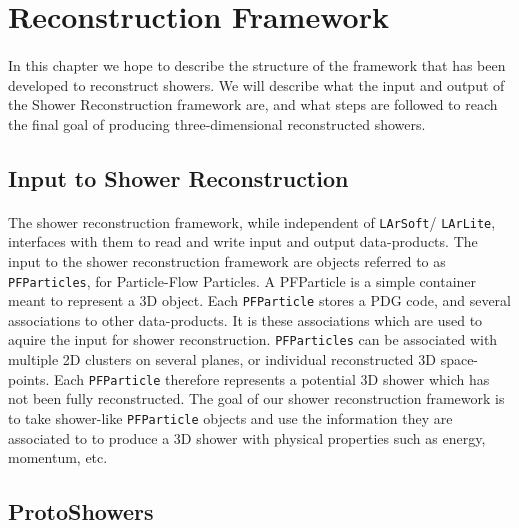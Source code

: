 \section{Reconstruction Framework}
\paragraph{}In this chapter we hope to describe the structure of the framework that has been developed to reconstruct showers. We will describe what the input and output of the Shower Reconstruction framework are, and what steps are followed to reach the final goal of producing three-dimensional reconstructed showers.

\subsection{Input to Shower Reconstruction}
\paragraph{}The shower reconstruction framework, while independent of \texttt{LArSoft}/ \texttt{LArLite}, interfaces with them to read and write input and output data-products. The input to the shower reconstruction framework are objects referred to as \texttt{PFParticles}, for Particle-Flow Particles. A PFParticle is a simple container meant to represent a 3D object. Each \texttt{PFParticle} stores a PDG code, and several associations to other data-products. It is these associations which are used to aquire the input for shower reconstruction. \texttt{PFParticles} can be associated with multiple 2D clusters on several planes, or individual reconstructed 3D space-points. Each \texttt{PFParticle} therefore represents a potential 3D shower which has not been fully reconstructed. The goal of our shower reconstruction framework is to take shower-like \texttt{PFParticle} objects and use the information they are associated to to produce a 3D shower with physical properties such as energy, momentum, etc.

\subsection{ProtoShowers}
